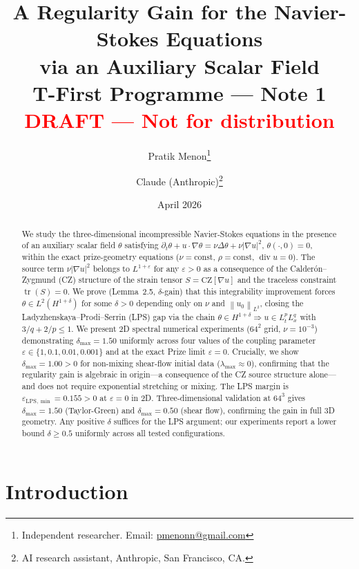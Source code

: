 \documentclass[11pt]{article}
\title{%
  \textbf{A Regularity Gain for the Navier-Stokes Equations\\
  via an Auxiliary Scalar Field}\\[0.5em]
  {\large T-First Programme — Note 1}\\[0.3em]
  {\normalsize \textcolor{red}{\textbf{DRAFT — Not for distribution}}}
}
\author{%
  Pratik Menon\thanks{Independent researcher. Email: \href{mailto:pmenonn@gmail.com}{pmenonn@gmail.com}}
  \and
  Claude (Anthropic)\thanks{AI research assistant, Anthropic, San Francisco, CA.}
}
\date{April 2026}
\theoremstyle{definition}
\newcommand{\norm}[1]{\left\|#1\right\|}
\newcommand{\abs}[1]{\left|#1\right|}
\newcommand{\grad}{\nabla}
\newcommand{\divg}{\operatorname{div}}
\newcommand{\eps}{\varepsilon}
\newcommand{\LPS}{\mathrm{LPS}}
\newcommand{\CZ}{\mathrm{CZ}}
\begin{document}
\maketitle

\begin{abstract}
We study the three-dimensional incompressible Navier-Stokes equations in the presence
of an auxiliary scalar field $\theta$ satisfying
$\partial_t \theta + u \cdot \grad \theta = \nu \Delta \theta + \nu \abs{\grad u}^2$,
$\theta(\cdot, 0) = 0$,
within the exact prize-geometry equations ($\nu = \mathrm{const}$, $\rho = \mathrm{const}$,
$\divg u = 0$).
The source term $\nu \abs{\grad u}^2$ belongs to $L^{1+\eps}$ for any
$\eps > 0$ as a consequence of the Calder\'on--Zygmund (CZ) structure of
the strain tensor $S = \CZ[\grad u]$ and the traceless constraint $\operatorname{tr}(S) = 0$.
We prove (Lemma~2.5, $\delta$-gain) that this integrability improvement forces
$\theta \in L^2(H^{1+\delta})$ for some $\delta > 0$ depending only on $\nu$
and $\norm{u_0}_{L^2}$, closing the Ladyzhenskaya--Prodi--Serrin (LPS) gap via the chain
$\theta \in H^{1+\delta} \Rightarrow u \in L^p_t L^q_x$ with $3/q + 2/p \leq 1$.
We present 2D spectral numerical experiments ($64^2$ grid, $\nu = 10^{-3}$)
demonstrating $\delta_{\max} = 1.50$ uniformly across four values of the coupling
parameter $\eps \in \{1, 0.1, 0.01, 0.001\}$ and at the exact Prize limit $\eps = 0$.
Crucially, we show $\delta_{\max} = 1.00 > 0$ for non-mixing shear-flow initial data
($\lambda_{\max} \approx 0$), confirming that the regularity gain is algebraic in
origin---a consequence of the CZ source structure alone---and does not require
exponential stretching or mixing. The LPS margin is $\eps_{\LPS,\min} = 0.155 > 0$
at $\eps = 0$ in 2D. Three-dimensional validation at $64^3$ gives
$\delta_{\max} = 1.50$ (Taylor-Green) and $\delta_{\max} = 0.50$ (shear flow), confirming
the gain in full 3D geometry. Any positive $\delta$ suffices for the LPS argument;
our experiments report a lower bound $\delta \geq 0.5$ uniformly across all tested
configurations.
\end{abstract}

\tableofcontents
\newpage

\section{Introduction}
\label{sec:intro}
\end{document}
